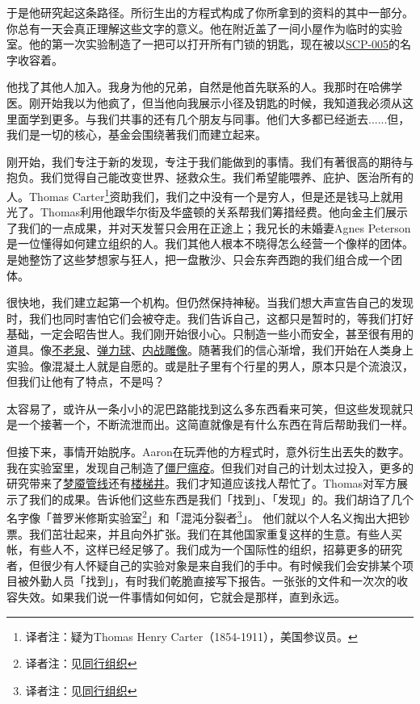 \documentclass[openany,a4paper]{book} %
\begin{document}
\begin{colorboxed}
于是他研究起这条路径。所衍生出的方程式构成了你所拿到的资料的其中一部分。你总有一天会真正理解这些文字的意义。他在附近盖了一间小屋作为临时的实验室。他的第一次实验制造了一把可以打开所有门锁的钥匙，现在被以\hyperref[chap:SCP-005]{SCP-005}的名字收容着。\vspace{12pt}

他找了其他人加入。我身为他的兄弟，自然是他首先联系的人。我那时在哈佛学医。刚开始我以为他疯了，但当他向我展示小径及钥匙的时候，我知道我必须从这里面学到更多。与我们共事的还有几个朋友与同事。他们大多都已经逝去......但，我们是一切的核心，基金会围绕著我们而建立起来。\vspace{12pt}

刚开始，我们专注于新的发现，专注于我们能做到的事情。我们有著很高的期待与抱负。我们觉得自己能改变世界、拯救众生。我们希望能喂养、庇护、医治所有的人。Thomas Carter\footnote{译者注：疑为Thomas Henry Carter（1854-1911），美国参议员。}资助我们，我们之中没有一个是穷人，但是还是钱马上就用光了。Thomas利用他跟华尔街及华盛顿的关系帮我们筹措经费。他向金主们展示了我们的一点成果，并对天发誓只会用在正途上；我兄长的未婚妻Agnes Peterson是一位懂得如何建立组织的人。我们其他人根本不晓得怎么经营一个像样的团体。是她整饬了这些梦想家与狂人，把一盘散沙、只会东奔西跑的我们组合成一个团体。\vspace{12pt}

很快地，我们建立起第一个机构。但仍然保持神秘。当我们想大声宣告自己的发现时，我们也同时害怕它们会被夺走。我们告诉自己，这都只是暂时的，等我们打好基础，一定会昭告世人。我们刚开始很小心。只制造一些小而安全，甚至很有用的道具。像\hyperref[chap:SCP-006]{不老泉}、\hyperref[chap:SCP-018]{弹力球}、\hyperref[chap:SCP-011]{内战雕像}。随著我们的信心渐增，我们开始在人类身上实验。像混凝土人就是自愿的。或是肚子里有个行星的男人，原本只是个流浪汉，但我们让他有了特点，不是吗？\vspace{12pt}

太容易了，或许从一条小小的泥巴路能找到这么多东西看来可笑，但这些发现就只是一个接著一个，不断流泄而出。这简直就像是有什么东西在背后帮助我们一样。\vspace{12pt}

但接下来，事情开始脱序。Aaron在玩弄他的方程式时，意外衍生出丟失的数字。我在实验室里，发现自己制造了\hyperref[chap:SCP-008]{僵尸瘟疫}。但我们对自己的计划太过投入，更多的研究带来了\hyperref[chap:SCP-015]{梦魇管线}还有\hyperref[chap:SCP-087]{楼梯井}。我们才知道应该找人帮忙了。Thomas对军方展示了我们的成果。告诉他们这些东西是我们「找到」、「发现」的。我们胡诌了几个名字像「普罗米修斯实验室\footnote{译者注：见\hyperref[chap:同行组织]{同行组织}}」和「混沌分裂者\footnote{译者注：见\hyperref[chap:同行组织]{同行组织}}」。 他们就以个人名义掏出大把钞票。我们茁壮起来，并且向外扩张。我们在其他国家重复这样的生意。有些人买帐，有些人不，这样已经足够了。我们成为一个国际性的组织，招募更多的研究者，但很少有人怀疑自己的实验对象是来自我们的手中。有时候我们会安排某个项目被外勤人员「找到」，有时我们乾脆直接写下报告。一张张的文件和一次次的收容失效。如果我们说一件事情如何如何，它就会是那样，直到永远。\vspace{12pt}


\end{colorboxed}
\end{document}

